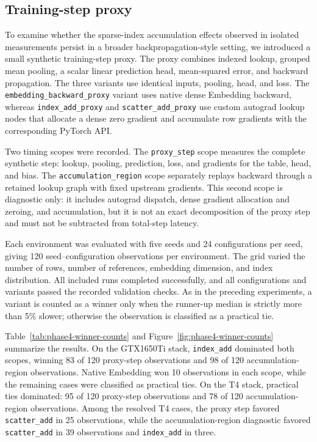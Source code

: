 \subsection{Training-step proxy}
\label{sec:phase4-training-proxy}

To examine whether the sparse-index accumulation effects observed in isolated
measurements persist in a broader backpropagation-style setting, we introduced a
small synthetic training-step proxy. The proxy combines indexed lookup, grouped
mean pooling, a scalar linear prediction head, mean-squared error, and backward
propagation. The three variants use identical inputs, pooling, head, and loss.
The \texttt{embedding\_\allowbreak backward\_\allowbreak proxy} variant uses native dense Embedding
backward, whereas \texttt{index\_\allowbreak add\_\allowbreak proxy} and
\texttt{scatter\_\allowbreak add\_\allowbreak proxy} use custom autograd lookup nodes that allocate a
dense zero gradient and accumulate row gradients with the corresponding PyTorch
API.

Two timing scopes were recorded. The \texttt{proxy\_\allowbreak step} scope measures the
complete synthetic step: lookup, pooling, prediction, loss, and gradients for the
table, head, and bias. The \texttt{accumulation\_\allowbreak region} scope separately replays
backward through a retained lookup graph with fixed upstream gradients. This
second scope is diagnostic only: it includes autograd dispatch, dense gradient
allocation and zeroing, and accumulation, but it is not an exact decomposition of
the proxy step and must not be subtracted from total-step latency.

Each environment was evaluated with five seeds and 24 configurations per seed,
giving 120 seed--configuration observations per environment. The grid varied the
number of rows, number of references, embedding dimension, and index
distribution. All included runs completed successfully, and all configurations
and variants passed the recorded validation checks. As in the preceding
experiments, a variant is counted as a winner only when the runner-up median is
strictly more than 5\% slower; otherwise the observation is classified as a
practical tie.

Table~\ref{tab:phase4-winner-counts} and
Figure~\ref{fig:phase4-winner-counts} summarize the results. On the GTX1650Ti stack, \texttt{index\_\allowbreak add} dominated both scopes, winning 83 of 120
proxy-step observations and 98 of 120 accumulation-region observations. Native
Embedding won 10 observations in each scope, while the remaining cases were
classified as practical ties. On the T4 stack, practical ties dominated: 95 of
120 proxy-step observations and 78 of 120 accumulation-region observations. Among
the resolved T4 cases, the proxy step favored \texttt{scatter\_\allowbreak add} in 25
observations, while the accumulation-region diagnostic favored
\texttt{scatter\_\allowbreak add} in 39 observations and \texttt{index\_\allowbreak add} in three.

